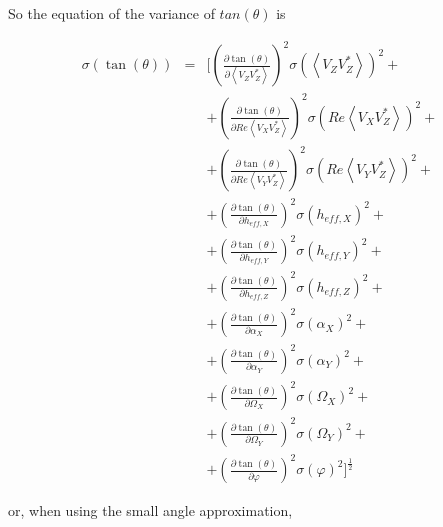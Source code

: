 \documentclass[a4paper,14pt]{extbook}
\begin{document}
So the equation of the variance of $tan(\theta)$ is

\begin{eqnarray}
\sigma (\tan (\theta)) &=&  [(\frac{\partial \tan (\theta)}{\partial \left\langle V_Z V_Z^{*}\right\rangle})^2 \sigma ( \left\langle V_Z V_Z^{*}\right\rangle)^2+\\
&&+ (\frac{\partial \tan (\theta)}{\partial Re \left\langle V_X V_Z^{*}\right\rangle})^2 \sigma (Re \left\langle V_X V_Z^{*}\right\rangle)^2 +\nonumber \\
&&+ (\frac{\partial \tan (\theta)}{\partial Re \left\langle V_Y V_Z^{*}\right\rangle})^2 \sigma (Re \left\langle V_Y V_Z^{*}\right\rangle)^2 +\nonumber \\
&&+ (\frac{\partial \tan (\theta)}{\partial h_{eff,X}})^2 \sigma (h_{eff,X})^2+ \nonumber \\
&&+ (\frac{\partial \tan (\theta)}{\partial h_{eff,Y}})^2 \sigma (h_{eff,Y})^2+ \nonumber \\
&&+ (\frac{\partial \tan (\theta)}{\partial h_{eff,Z}})^2 \sigma (h_{eff,Z})^2+ \nonumber \\
&&+ (\frac{\partial \tan (\theta)}{\partial \alpha_X})^2 \sigma (\alpha_X)^2+ \nonumber \\
&&+ (\frac{\partial \tan (\theta)}{\partial \alpha_Y})^2 \sigma (\alpha_Y)^2+ \nonumber \\
&&+ (\frac{\partial \tan (\theta)}{\partial \Omega_X})^2 \sigma (\Omega_X)^2+ \nonumber \\
&&+ (\frac{\partial \tan (\theta)}{\partial \Omega_Y})^2 \sigma (\Omega_Y)^2+ \nonumber \\
&&+ (\frac{\partial \tan (\theta)}{\partial \varphi})^2 \sigma (\varphi)^2 ]^\frac{1}{2}\nonumber
\end{eqnarray}

or, when using the small angle approximation,
\end{document}

